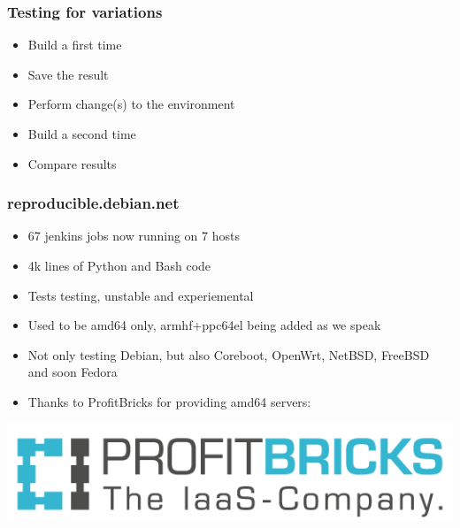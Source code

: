 \documentclass[14pt]{beamer}
\begin{document}
\begin{frame}
 \frametitle{Testing for variations}

 \begin{itemize}
  \item Build a first time
  \item Save the result
  \item Perform change(s) to the environment
  \item Build a second time
  \item Compare results
 \end{itemize}
\end{frame}

\begin{frame}
 \frametitle{reproducible.debian.net}

 \begin{itemize}
  \item 67 jenkins jobs now running on 7 hosts
  \item 4k lines of Python and Bash code
  \item Tests testing, unstable and experiemental
  \item Used to be amd64 only, armhf+ppc64el being added as we speak
  \item Not only testing Debian, but also Coreboot, OpenWrt, NetBSD, FreeBSD and soon Fedora
  \item Thanks to ProfitBricks for providing amd64 servers:
 \end{itemize}
 \vfill
 \begin{center}
 \includegraphics[height=0.15\paperheight]{images/profitbricks_logo.png}
 \end{center}
\end{frame}
\end{document}
